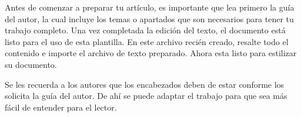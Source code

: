     Antes de comenzar a preparar tu artículo, es importante que lea primero la guía del autor, la cual incluye los temas o apartados que son necesarios para tener tu trabajo completo.
    Una vez completada la edición del texto, el documento está listo para el uso de esta plantilla. En este archivo recién creado, resalte todo el contenido e importe el archivo de texto preparado. Ahora esta listo para estilizar su documento.
    
    
    
    
    Se les recuerda a los autores que los encabezados deben de estar conforme los solicita la guía del autor. De ahí se puede adaptar el trabajo para que sea más fácil de entender para el lector.
    
    
    
    
